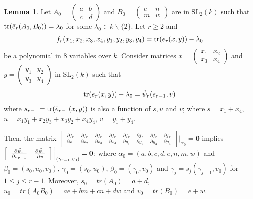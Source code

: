 \documentclass[10pt,twoside]{amsart}
\newcommand{\SL}{\mathrm{SL}}
\newcommand{\tr}{\mathrm{tr}}
\theoremstyle{definition}
\theoremstyle{definition}
\newtheorem{lemma}[theorem]{Lemma}
\begin{document}
\begin{lemma}{\label{tr 2}}
Let $A_0 = \left (\begin{array}{cc} a  & b \\ c & d \end{array}\right)$ and $B_0=\left (\begin{array}{cc} e & n \\
m & w  \end{array}\right )$ are in $\SL_2(k)$ such that $\tr(\Bar{e}_r(A_0, B_0)) = \lambda_0$ for some $\lambda_0\in k\backslash\{2\}$. Let $r\geq 2$ and  $$f_r(x_1, x_2, x_3, x_4, y_1, y_2, y_3, y_4) = \tr(\Bar{e}_r(x,y))-\lambda_0$$ be a polynomial in $8$ variables over $k$. Consider matrices $x=\left (\begin{array}{cc} x_1  & x_2 \\
        x_3 & x_4
\end{array}\right)$ and $y=\left (\begin{array}{cc}
       y_1  & y_2 \\
        y_3 & y_4
\end{array}\right)$ in $\SL_2(k)$ such that $$\tr(\Bar{e}_r(x,y))-\lambda_0=\Tilde{\psi}_r(s_{r-1},v)$$ where $s_{r-1} = \tr(\Bar{e}_{r-1}(x,y))$ is also a function of $s,u$ and $v$; where $s=x_1+x_4$, $u=x_1y_1+x_2y_3+x_3y_2+x_4y_4$, $v=y_1+y_4$. 
    
Then, the matrix $\left[\begin{array}{cccccccc}
\frac{\partial f_r}{\partial x_1} & \frac{\partial f_r}{\partial x_2} & \frac{\partial f_r}{\partial x_3} & \frac{\partial f_r}{\partial x_4} & \frac{\partial f_r}{\partial y_1} & \frac{\partial f_r}{\partial y_2} & \frac{\partial f_r}{\partial y_3} & \frac{\partial f_r}{\partial y_4}
\end{array}\right]\Big|_{\alpha_0} = \mathbf{0}$ implies $\left[\begin{array}{ccc}
\frac{\partial\Tilde{\psi}_r}{\partial s_{r-1}} & \frac{\partial\Tilde{\psi}_r}{\partial v}  \end{array}\right]\Big |_{(\gamma_{r-1},v_0)}=\mathbf{0}$; where $\alpha_0=(a,b,c,d,e,n,m,w)$ and $\beta_0=(s_0,u_0,v_0)$, $\gamma_0=(s_0,u_0)$, $\beta_0=(\gamma_0,v_0)$ and $\gamma_j=s_j(\gamma_{j-1},v_0)$ for $1\leq j\leq r-1$. Moreover, $s_0 = tr(A_0) = a+d$, $u_0 = tr(A_0B_0) = ae+bm+cn+dw$ and $v_0=tr(B_0)=e+w$.
\end{lemma}
\end{document}
